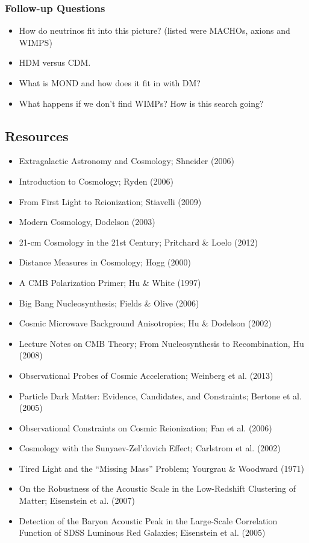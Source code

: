 \documentclass[a4paper,11pt]{article}
\begin{document}
\subsubsection{Follow-up Questions}

\begin{itemize}
    \item How do neutrinos fit into this picture? (listed were MACHOs, axions and WIMPS)
    \item HDM versus CDM.
    \item What is MOND and how does it fit in with DM?
    \item What happens if we don't find WIMPs? How is this search going?
\end{itemize}


\newpage
\subsection{Resources}

\begin{itemize}
    \item Extragalactic Astronomy and Cosmology; Shneider (2006)
    \item Introduction to Cosmology; Ryden (2006)
    \item From First Light to Reionization; Stiavelli (2009)
    \item Modern Cosmology, Dodelson (2003)
    \item 21-cm Cosmology in the 21st Century; Pritchard \& Loelo (2012)
    \item Distance Measures in Cosmology; Hogg (2000)
    \item A CMB Polarization Primer; Hu \& White (1997)
    \item Big Bang Nucleosynthesis; Fields \& Olive (2006)
    \item Cosmic Microwave Background Anisotropies; Hu \& Dodelson (2002)
    \item Lecture Notes on CMB Theory; From Nucleosynthesis to Recombination, Hu (2008)
    \item Observational Probes of Cosmic Acceleration; Weinberg et al. (2013)
    \item Particle Dark Matter: Evidence, Candidates, and Constraints; Bertone et al. (2005)
    \item Observational Constraints on Cosmic Reionization; Fan et al. (2006)
    \item Cosmology with the Sunyaev-Zel'dovich Effect; Carlstrom et al. (2002)
    \item Tired Light and the ``Missing Mass'' Problem; Yourgrau \& Woodward (1971)
    \item On the Robustness of the Acoustic Scale in the Low-Redshift Clustering of Matter; Eisenstein et al. (2007)
    \item Detection of the Baryon Acoustic Peak in the Large-Scale Correlation Function of SDSS Luminous Red Galaxies; Eisenstein et al. (2005)
\end{itemize}
\end{document}
